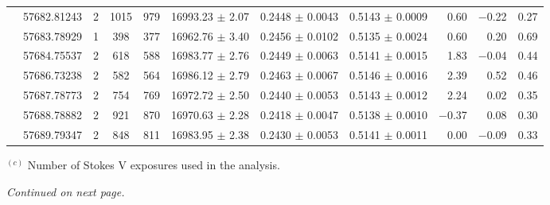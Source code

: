 \documentclass[a4paper,fleqn,usenatbib]{mnras}
\begin{document}
\begin{table*}
\begin{threeparttable}
{\begin{tabular}{c c c c c c c c r r c}
 & 57682.81243  & 2 & 1015 & 979   & 16993.23 $\pm$ 2.07  &   0.2448 $\pm$ 0.0043  &   0.5143 $\pm$ 0.0009  &    0.60  &$-$0.22 &   0.27 \\  
 & 57683.78929  & 1 &  398  & 377  & 16962.76 $\pm$ 3.40  &   0.2456 $\pm$ 0.0102  &   0.5135 $\pm$ 0.0024  &     0.60  & 0.20 & 0.69 \\  
 & 57684.75537  & 2 &  618  & 588  & 16983.77 $\pm$ 2.76  &   0.2449 $\pm$ 0.0063  &   0.5141 $\pm$ 0.0015  &     1.83  &$-$0.04 &   0.44  \\  
 & 57686.73238  & 2 &  582  & 564  & 16986.12 $\pm$ 2.79  &   0.2463 $\pm$ 0.0067  &   0.5146 $\pm$ 0.0016  &     2.39  & 0.52 & 0.46\\ 
 & 57687.78773  & 2 &  754  & 769  & 16972.72 $\pm$ 2.50  &   0.2440 $\pm$ 0.0053  &   0.5143 $\pm$ 0.0012  &     2.24  & 0.02 &   0.35 \\   
 & 57688.78882  & 2 &  921  & 870  & 16970.63 $\pm$ 2.28  &   0.2418 $\pm$ 0.0047  &   0.5138 $\pm$ 0.0010  &$-$0.37  & 0.08 &    0.30 \\  
 & 57689.79347  & 2 &  848  & 811  & 16983.95 $\pm$ 2.38  &   0.2430 $\pm$ 0.0053  &   0.5141 $\pm$ 0.0011  &     0.00 & $-$0.09 &   0.33  \\[3pt]  
\hline                 
\end{tabular}}
\begin{tablenotes}{\vspace{-2pt}}
\item {\scriptsize $^{(c)}$ Number of Stokes V exposures used in the analysis.}\\
\smallskip
\item {\hfill \textit{Continued on next page.}}
\end{tablenotes}
\end{threeparttable}
\end{table*}
\end{document}
